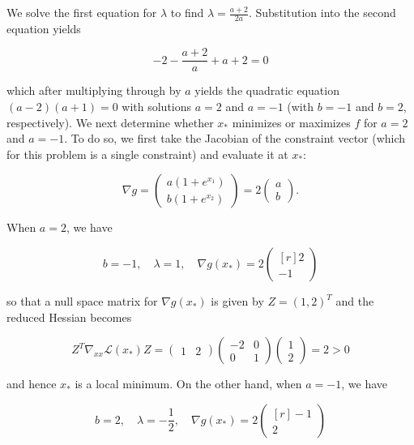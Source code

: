 \begin{solution}
    We solve the first equation for $\lambda$ to find $\lambda = \frac{a + 2}{2a}$. Substitution into the second 
    equation yields

    $$
    -2 - \frac{a + 2}{a} + a + 2 = 0
    $$

    which after multiplying through by $a$ yields the quadratic equation $(a - 2)(a + 1) = 0$ with solutions $a = 2$ and
    $a = -1$ (with $b = -1$ and $b = 2$, respectively). We next determine whether $x_*$ minimizes or maximizes $f$ for
    $a = 2$ and $a = -1$. To do so, we first take the Jacobian of the constraint vector (which for this problem is a
    single constraint) and evaluate it at $x_*$:

    $$
    \nabla g = \begin{pmatrix*}
        a \left(1 + e^{x_1} \right) \\
        b \left(1 + e^{x_2} \right)
    \end{pmatrix*} = 2 \begin{pmatrix*}
        a \\
        b
    \end{pmatrix*}.
    $$

    When $a = 2$, we have 
    
    $$
    b = -1, \quad \lambda = 1, \quad \nabla g(x_*) = 2 \begin{pmatrix*}[r]
        2 \\
       -1
    \end{pmatrix*}
    $$

    so that a null space matrix for $\nabla g(x_*)$ is given by $Z = (1, 2)^T$ and the reduced Hessian becomes

    $$
    Z^T \nabla_{xx} \mathcal{L}(x_*) Z = \begin{pmatrix*}
        1 & 2
    \end{pmatrix*} \begin{pmatrix*}
        -2 & 0 \\
         0 & 1
    \end{pmatrix*} \begin{pmatrix*}
        1 \\
        2
    \end{pmatrix*} = 2 > 0
    $$

    and hence $x_*$ is a local minimum. On the other hand, when $a = -1$, we have

    $$
    b = 2, \quad \lambda = -\frac{1}{2}, \quad \nabla g(x_*) = 2 \begin{pmatrix*}[r]
       -1 \\
        2
    \end{pmatrix*}
    $$


\end{solution}
